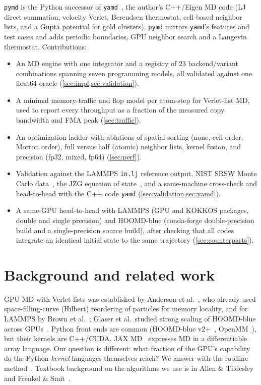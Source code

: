 \documentclass[11pt]{article}
\newcommand{\pymd}{\texttt{pymd}}
\newcommand{\yamd}{\texttt{yamd}}
\begin{document}
\pymd{} is the Python successor of \yamd{}~\cite{yamd}, the author's C++/Eigen MD code
(LJ direct summation, velocity Verlet, Berendsen thermostat, cell-based neighbor lists, and a
Gupta potential for gold clusters). \pymd{} mirrors \yamd's features and test cases and adds
periodic boundaries, GPU neighbor search and a Langevin thermostat. Contributions:
\begin{itemize}
\item An MD engine with one integrator and a registry of 23 backend/variant combinations
  spanning seven programming models, all validated against one float64 oracle
  (\cref{sec:impl,sec:validation}).
\item A minimal memory-traffic and flop model per atom-step for Verlet-list MD, used to report
  every throughput as a fraction of the measured copy bandwidth and FMA peak
  (\cref{sec:traffic}).
\item An optimization ladder with ablations of spatial sorting (none, cell order, Morton
  order), full versus half (atomic) neighbor lists, kernel fusion, and precision (fp32, mixed,
  fp64) (\cref{sec:perf}).
\item Validation against the LAMMPS \texttt{in.lj} reference output, NIST SRSW Monte Carlo
  data~\cite{nist_srsw}, the JZG equation of state~\cite{johnson1993lj}, and a same-machine
  cross-check and head-to-head with the C++ code \yamd{} (\cref{sec:validation,sec:yamd}).
\item A same-GPU head-to-head with LAMMPS (GPU and KOKKOS packages, double and single
  precision) and HOOMD-blue (conda-forge double-precision build and a single-precision source
  build), after checking that all codes integrate an identical initial state to the same
  trajectory (\cref{sec:counterparts}).
\end{itemize}

\section{Background and related work}
GPU MD with Verlet lists was established by Anderson et al.~\cite{anderson2008hoomd}, who
already used space-filling-curve (Hilbert) reordering of particles for memory locality, and
for LAMMPS by Brown et al.~\cite{brown2011lammpsgpu}; Glaser et al.\ studied strong scaling
of HOOMD-blue across GPUs~\cite{glaser2015}. Python front ends are common (HOOMD-blue v2+~\cite{anderson2020hoomd},
OpenMM~\cite{eastman2024openmm}), but their kernels are C++/CUDA. JAX MD~\cite{schoenholz2020jaxmd}
expresses MD in a differentiable array language. Our question is different: what fraction of
the GPU's capability do the Python \emph{kernel} languages themselves reach? We answer with the
roofline method~\cite{williams2009roofline}. Textbook background on the algorithms we use is
in Allen \& Tildesley~\cite{allen2017} and Frenkel \& Smit~\cite{frenkel2002}.
\end{document}
